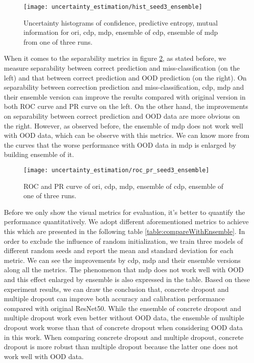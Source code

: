 \begin{figure}[H]
	\begin{center}
		\texttt{[image: uncertainty\_estimation/hist\_seed3\_ensemble]}
		\caption{Uncertainty histograms of confidence, predictive entropy, mutual information for ori, cdp, mdp, ensemble of cdp, ensemble of mdp from one of three runs.}		
		\label{exp2_histo}
	\end{center}
\end{figure}

When it comes to the separability metrics in figure \ref{exp2_roc_pr}, as stated before, we measure separability between correct prediction and miss-classification (on the left) and that between correct prediction and OOD prediction (on the right). On separability between correction prediction and miss-classification, cdp, mdp and their ensemble version can improve the results compared with original version in both ROC curve and PR curve on the left. On the other hand, the improvements on separability between correct prediction and OOD data are more obvious on the right. However, as observed before, the ensemble of mdp does not work well with OOD data, which can be observe with this metrics. We can know more from the curves that the worse performance with OOD data in mdp is enlarged by building ensemble of it.    

\begin{figure}[h!]
	\begin{center}
		\texttt{[image: uncertainty\_estimation/roc\_pr\_seed3\_ensemble]}
		\caption{ROC and PR curve of ori, cdp, mdp, ensemble of cdp, ensemble of one of three runs.}		
		\label{exp2_roc_pr}
	\end{center} 
\end{figure}

Before we only show the visual metrics for evaluation, it's better to quantify the performance quantitatively. We adopt different aforementioned metrics to achieve this which are presented in the following table \ref{table:compareWithEnsemble}. In order to exclude the influence of random initialization, we train three models of different random seeds and report the mean and standard deviation for each metric. We can see the improvements by cdp, mdp and their ensemble versions along all the metrics. The phenomenon that mdp does not work well with OOD and this effect enlarged by ensemble is also expressed in the table. Based on these experiment results, we can draw the conclusion that, concrete dropout and multiple dropout can improve both accuracy and calibration performance compared with original ResNet50. While the ensemble of concrete dropout and multiple dropout work even better without OOD data, the ensemble of multiple dropout work worse than that of concrete dropout when considering OOD data in this work. When comparing concrete dropout and multiple dropout, concrete dropout is more robust than multiple dropout because the latter one does not work well with OOD data.


